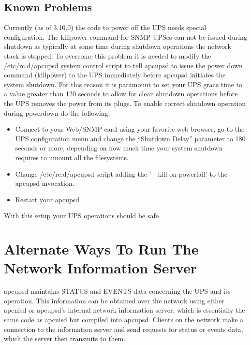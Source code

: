 {{{{{{{{{{\label{Known-Problems}

\subsection*{Known Problems}

Currently (as of 3.10.0) the code to power off the UPS needs special
configuration. The killpower command for SNMP UPSes can not be issued during
shutdown as typically at some time during shutdown operations the network
stack is stopped. To overcome this problem it is needed to modify the
/etc/rc.d/apcupsd system control script to tell apcupsd to issue the power
down command (killpower) to the UPS immediately before apcupsd initiates the
system shutdown. For this reason it is paramount to set your UPS grace time to
a value greater than 120 seconds to allow for clean shutdown operations before
the UPS removes the power from its plugs. To enable correct shutdown operation
during powerdown do the following:  

\begin{itemize}
\item Connect to your Web/SNMP card using your favorite web browser, go to the
   UPS configuration menu and change the ``Shutdown Delay'' parameter to 180
   seconds or more, depending on how much time your system shutdown requires to
umount all the filesystems.  
\item Change /etc/rc.d/apcupsd script adding the '{---}kill-on-powerfail' to
   the apcupsd invocation.  
\item Restart your apcupsd 
   \end{itemize}

With this setup your UPS operations should be safe. 

\label{Alternate-Ways-To-Run-The-Network-Information-Server}

\section*{Alternate Ways To Run The Network Information Server}

\label{index-NIS-alternate-was-of-running-165}
apcupsd maintains STATUS and EVENTS data concerning the UPS and its operation.
This information can be obtained over the network using either apcnisd or
apcupsd's internal network information server, which is essentially the same
code as apcnisd but compiled into apcupsd. Clients on the network make a
connection to the information server and send requests for status or events
data, which the server then transmits to them.  

}}}}}}}}}}
